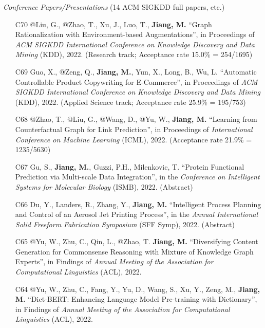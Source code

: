 \documentclass[10pt]{article}
\newenvironment{myindentpar}[1]%
{\begin{list}{}%
         {\setlength{\leftmargin}{#1}}%
         \item[]%
}
{\end{list}}
\newcounter{list}
\begin{document}
\begin{myindentpar}{0.00cm}

\hspace{-0.25cm}\textit{Conference Papers/Presentations} {\small (14 ACM SIGKDD full papers, etc.)}

\begin{enumerate}[leftmargin=.5cm]

\item[C70] @Liu, G., @Zhao, T., Xu, J., Luo, T., \textbf{Jiang, M.} ``Graph Rationalization with Environment-based Augmentations'', in Proceedings of \textit{ACM SIGKDD International Conference on Knowledge Discovery and Data Mining} (KDD), 2022. (Research track; Acceptance rate 15.0\% = 254/1695)

\item[C69] Guo, X., @Zeng, Q., \textbf{Jiang, M.}, Yun, X., Long, B., Wu, L. ``Automatic Controllable Product Copywriting for E-Commerce'', in Proceedings of \textit{ACM SIGKDD International Conference on Knowledge Discovery and Data Mining} (KDD), 2022. (Applied Science track; Acceptance rate 25.9\% = 195/753)

\item[C68] @Zhao, T., @Liu, G., @Wang, D., @Yu, W., \textbf{Jiang, M.} ``Learning from Counterfactual Graph for Link Prediction'', in Proceedings of \textit{International Conference on Machine Learning} (ICML), 2022. (Acceptance rate 21.9\% = 1235/5630)

\item[C67] Gu, S., \textbf{Jiang, M.}, Guzzi, P.H., Milenkovic, T. ``Protein Functional Prediction via Multi-scale Data Integration'', in the \textit{Conference on Intelligent Systems for Molecular Biology} (ISMB), 2022. (Abstract)

\item[C66] Du, Y., Landers, R., Zhang, Y., \textbf{Jiang, M.} ``Intelligent Process Planning and Control of an Aerosol Jet Printing Process'', in the \textit{Annual International Solid Freeform Fabrication Symposium} (SFF Symp), 2022. (Abstract)

\item[C65] @Yu, W., Zhu, C., Qin, L., @Zhao, T. \textbf{Jiang, M.} ``Diversifying Content Generation for Commonsense Reasoning with Mixture of Knowledge Graph Experts'', in Findings of \textit{Annual Meeting of the Association for Computational Linguistics} (ACL), 2022.

\item[C64] @Yu, W., Zhu, C., Fang, Y., Yu, D., Wang, S., Xu, Y., Zeng, M., \textbf{Jiang, M.} ``Dict-BERT: Enhancing Language Model Pre-training with Dictionary'', in Findings of \textit{Annual Meeting of the Association for Computational Linguistics} (ACL), 2022.


\end{enumerate}
\end{myindentpar}
\end{document}
